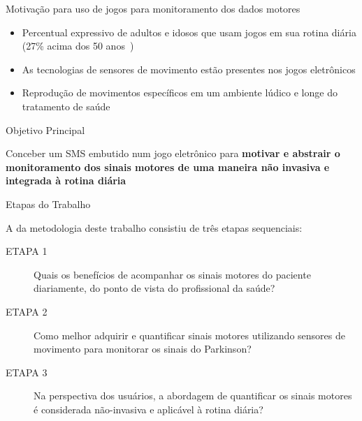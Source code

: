 \documentclass{beamer}
\begin{document}
\begin{frame}{Motivação para uso de jogos para monitoramento dos dados motores}
	\begin{block}{}
	\begin{itemize}
	    \item Percentual expressivo de adultos e idosos que usam jogos em sua rotina diária (27\% acima dos 50 anos~\cite{esa2015})
	    \item As tecnologias de sensores de movimento estão presentes nos jogos eletrônicos
	    \item Reprodução de movimentos específicos em um ambiente lúdico e longe do tratamento de saúde
	\end{itemize}
	\end{block}
	
\end{frame}


\begin{frame}{Objetivo Principal}
  \begin{block}{}
  Conceber um SMS embutido num jogo eletrônico para \textbf{motivar e abstrair o monitoramento dos sinais motores de uma maneira não invasiva e integrada à rotina diária}
  \end{block}
\end{frame}


\begin{frame}{Etapas do Trabalho}
	\begin{block}{}
	  A da metodologia deste trabalho consistiu de três etapas sequenciais:
		  \begin{description}
		  \item[ETAPA 1] Quais os benefícios de acompanhar os sinais motores do paciente diariamente, do ponto de vista do profissional da saúde?
		  \item[ETAPA 2] Como melhor adquirir e quantificar sinais motores utilizando sensores de movimento para monitorar os sinais do Parkinson?
		  \item[ETAPA 3] Na perspectiva dos usuários, a abordagem de quantificar os sinais motores é considerada não-invasiva e aplicável à rotina diária?
		  \end{description}
	\end{block}
\end{frame}
\end{document}
